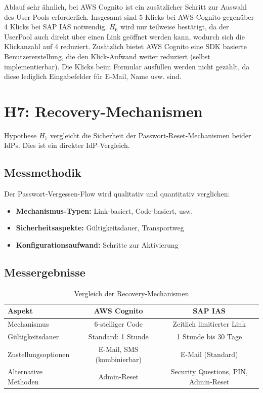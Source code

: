 Ablauf sehr ähnlich, bei \ac{AWS} Cognito ist ein zusätzlicher Schritt zur Auswahl des User Pools erforderlich. Insgesamt sind 5 Klicks bei \ac{AWS} Cognito gegenüber 4 Klicks bei \ac{SAP IAS} notwendig.
$H_6$ wird nur teilweise bestätigt, da der UserPool auch direkt über einen Link geöffnet werden kann, wodurch sich die Klickanzahl auf 4 reduziert.
Zusätzlich bietet \ac{AWS} Cognito eine \ac{SDK} basierte Benutzererstellung, die den Klick-Aufwand weiter reduziert (selbst implementierbar).
Die Klicks beim Formular ausfüllen werden nicht gezählt, da diese lediglich Eingabefelder für E-Mail, Name usw. sind.


\section{H7: Recovery-Mechanismen}

Hypothese $H_7$ vergleicht die Sicherheit der Passwort-Reset-Mechanismen beider
\ac{IdP}s. Dies ist ein direkter \ac{IdP}-Vergleich.

\subsection{Messmethodik}

Der Passwort-Vergessen-Flow wird qualitativ und quantitativ verglichen:
\begin{itemize}
    \item \textbf{Mechanismus-Typen:} Link-basiert, Code-basiert, usw.
    \item \textbf{Sicherheitsaspekte:} Gültigkeitsdauer, Transportweg
    \item \textbf{Konfigurationsaufwand:} Schritte zur Aktivierung
\end{itemize}

\subsection{Messergebnisse}

\begin{table}[h]
    \centering
    \begin{tabular}{|l|c|c|}
        \hline
        \textbf{Aspekt} & \textbf{AWS Cognito} & \textbf{SAP IAS} \\
        \hline
        Mechanismus & 6-stelliger Code & Zeitlich limitierter Link \\
        \hline
        Gültigkeitsdauer & Standard: 1 Stunde & 1 Stunde bis 30 Tage \\
        \hline
        Zustellungsoptionen & E-Mail, SMS (kombinierbar) & E-Mail (Standard) \\
        \hline
        Alternative Methoden & Admin-Reset & Security Questions, PIN, Admin-Reset \\
        \hline
    \end{tabular}
    \caption{Vergleich der Recovery-Mechanismen}
    \label{tab:h7_recovery}
\end{table}

